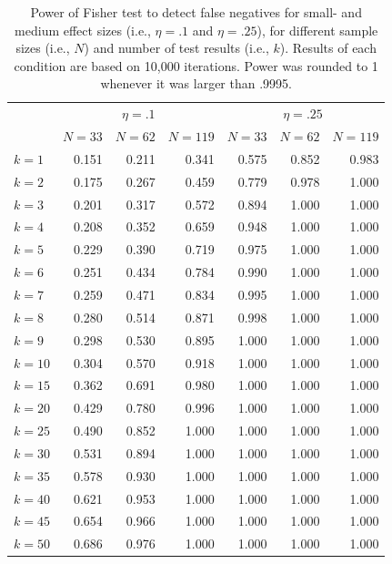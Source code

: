 \documentclass[a5paper]{book}
\begin{document}
\begin{table}[!h]

\caption{\label{tab:tgtbf-tab2}Power of Fisher test to detect false negatives for small- and medium effect sizes (i.e., $\eta=.1$ and $\eta=.25$), for different sample sizes (i.e., $N$) and number of test results (i.e., $k$). Results of each condition are based on 10,000 iterations. Power was rounded to 1 whenever it was larger than .9995.}
\centering
\begin{tabular}{lrrrrrr}
\toprule
\multicolumn{1}{c}{ } & \multicolumn{3}{c}{$\eta=.1$} & \multicolumn{3}{c}{$\eta=.25$} \\
\cmidrule(l{3pt}r{3pt}){2-4} \cmidrule(l{3pt}r{3pt}){5-7}
 & $N=33$ & $N=62$ & $N=119$ & $N=33$ & $N=62$ & $N=119$\\
\midrule
\rowcolor{gray!6}  $k = 1$ & 0.151 & 0.211 & 0.341 & 0.575 & 0.852 & 0.983\\
$k = 2$ & 0.175 & 0.267 & 0.459 & 0.779 & 0.978 & 1.000\\
\rowcolor{gray!6}  $k = 3$ & 0.201 & 0.317 & 0.572 & 0.894 & 1.000 & 1.000\\
$k = 4$ & 0.208 & 0.352 & 0.659 & 0.948 & 1.000 & 1.000\\
\rowcolor{gray!6}  $k = 5$ & 0.229 & 0.390 & 0.719 & 0.975 & 1.000 & 1.000\\
\addlinespace
$k = 6$ & 0.251 & 0.434 & 0.784 & 0.990 & 1.000 & 1.000\\
\rowcolor{gray!6}  $k = 7$ & 0.259 & 0.471 & 0.834 & 0.995 & 1.000 & 1.000\\
$k = 8$ & 0.280 & 0.514 & 0.871 & 0.998 & 1.000 & 1.000\\
\rowcolor{gray!6}  $k = 9$ & 0.298 & 0.530 & 0.895 & 1.000 & 1.000 & 1.000\\
$k = 10$ & 0.304 & 0.570 & 0.918 & 1.000 & 1.000 & 1.000\\
\addlinespace
\rowcolor{gray!6}  $k = 15$ & 0.362 & 0.691 & 0.980 & 1.000 & 1.000 & 1.000\\
$k = 20$ & 0.429 & 0.780 & 0.996 & 1.000 & 1.000 & 1.000\\
\rowcolor{gray!6}  $k = 25$ & 0.490 & 0.852 & 1.000 & 1.000 & 1.000 & 1.000\\
$k = 30$ & 0.531 & 0.894 & 1.000 & 1.000 & 1.000 & 1.000\\
\rowcolor{gray!6}  $k = 35$ & 0.578 & 0.930 & 1.000 & 1.000 & 1.000 & 1.000\\
\addlinespace
$k = 40$ & 0.621 & 0.953 & 1.000 & 1.000 & 1.000 & 1.000\\
\rowcolor{gray!6}  $k = 45$ & 0.654 & 0.966 & 1.000 & 1.000 & 1.000 & 1.000\\
$k = 50$ & 0.686 & 0.976 & 1.000 & 1.000 & 1.000 & 1.000\\
\bottomrule
\end{tabular}
\end{table}
\end{document}
